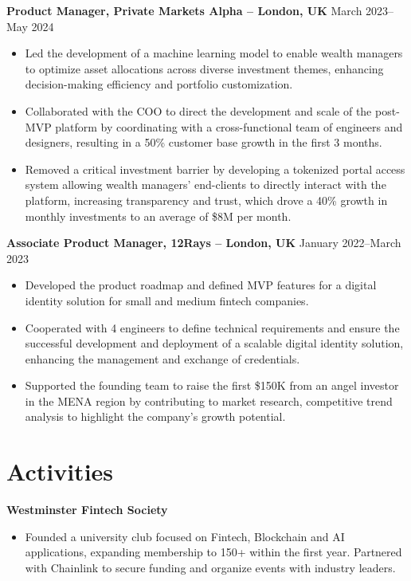 \documentclass{article}
\begin{document}
\textbf{Product Manager, Private Markets Alpha -- London, UK} \hfill March 2023--May 2024
\begin{itemize}[leftmargin=*,noitemsep]
    \item Led the development of a machine learning model to enable wealth managers to optimize asset allocations across diverse investment themes, enhancing decision-making efficiency and portfolio customization.
    \item Collaborated with the COO to direct the development and scale of the post-MVP platform by coordinating with a cross-functional team of engineers and designers, resulting in a 50\% customer base growth in the first 3 months.
    \item Removed a critical investment barrier by developing a tokenized portal access system allowing wealth managers' end-clients to directly interact with the platform, increasing transparency and trust, which drove a 40\% growth in monthly investments to an average of \$8M per month.
\end{itemize}

\textbf{Associate Product Manager, 12Rays -- London, UK} \hfill January 2022--March 2023
\begin{itemize}[leftmargin=*,noitemsep]
    \item Developed the product roadmap and defined MVP features for a digital identity solution for small and medium fintech companies.
    \item Cooperated with 4 engineers to define technical requirements and ensure the successful development and deployment of a scalable digital identity solution, enhancing the management and exchange of credentials.
    \item Supported the founding team to raise the first \$150K from an angel investor in the MENA region by contributing to market research, competitive trend analysis to highlight the company's growth potential.
\end{itemize}

\section*{Activities}
\textbf{Westminster Fintech Society}
\begin{itemize}[leftmargin=*,noitemsep]
    \item Founded a university club focused on Fintech, Blockchain and AI applications, expanding membership to 150+ within the first year. Partnered with Chainlink to secure funding and organize events with industry leaders.
\end{itemize}
\end{document}
